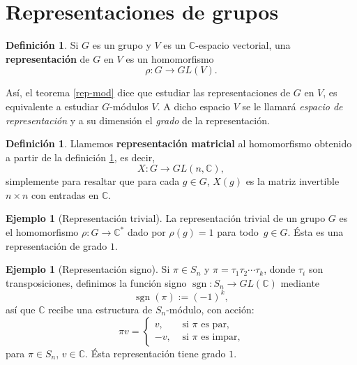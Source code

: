 \documentclass[12pt]{book}
\theoremstyle{definition}
\newtheorem{definition}[theorem]{Definición}
\newtheorem{example}[theorem]{Ejemplo}
\DeclareMathOperator{\sgn}{sgn}
\newcounter{in}
\newcounter{ini}
\begin{document}
\section{Representaciones de grupos}
\label{rep-grup}

\begin{definition}
  \label{representacion}
  Si $G$ es un grupo y $V$ es un $\mathbb{C}$-espacio vectorial, una
  \textbf{representación} de $G$ en $V$ es un homomorfismo 
     $$\rho:G\rightarrow GL(V).$$
\end{definition}

Así, el teorema \ref{rep-mod} dice que estudiar las representaciones de $G$
en $V$, es equivalente a estudiar $G$-módulos $V$.  A
dicho espacio $V$ se le llamará \emph{espacio de representación} y a
su dimensión el \emph{grado} de la representación. 

\begin{definition}
  Llamemos \textbf{representación matricial} al homomorfismo
  obtenido a partir de la definición \ref{representacion}, es decir, 
  $$X:G\rightarrow GL(n,\mathbb{C}),$$
  simplemente para resaltar que para cada $g\in G$, $X(g)$  es la
  matriz invertible~$n \times n$ con entradas en $\mathbb{C}$.
\end{definition}


\begin{example}[Representación trivial]
  La representación trivial de un grupo $G$ es el homomorfismo
  $\rho:G\rightarrow \mathbb{C^{*}}$ dado por $\rho(g)=1$ para todo~$g\in G$. Ésta es una representación de grado $1$.
\end{example}

\begin{example}[Representación signo]
  Si $\pi\in S_{n}$ y $\pi=\tau_{1}\tau_{2}\cdots\tau_{k}$, donde $\tau_{i}$ son
  transposiciones, definimos la función signo
  $\sgn:S_{n} \rightarrow GL(\mathbb{C})$
  mediante $$\sgn(\pi):=(-1)^{k},$$
  así que $\mathbb{C}$ recibe una estructura de $S_{n}$-módulo, con acción:
  \[
  \pi v=
  \begin{cases}
    v, & \text{ si } \pi \text{ es par,}\\
    -v, & \text{ si } \pi \text{ es impar,}
  \end{cases}
  \]
  para $\pi\in S_{n}$, $v\in \mathbb{C}$. Ésta representación tiene grado $1$.
\end{example}
\end{document}
